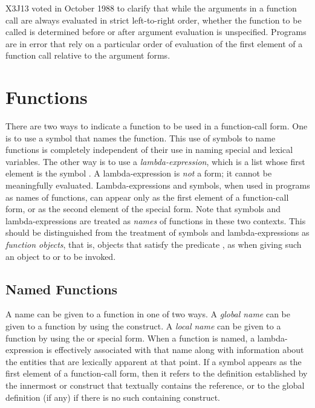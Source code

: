 \begin{newer}
X3J13 voted in October 1988 
to clarify that while the arguments in a function call are always
evaluated in strict left-to-right order, whether the function to
be called is determined before or after argument evaluation
is unspecified.  Programs are in error
that rely on a particular order of evaluation
of the first element of a function call relative to the
argument forms.
\end{newer}

\section{Functions}

There are two ways to indicate a function to be used in a function-call
form.  One is to use a symbol that names the function.  This use of
symbols to name functions is completely independent of their use in
naming special and lexical variables.  The other way is to use a
\emph{lambda-expression}, which is a list whose first element is the symbol
.  A lambda-expression is \emph{not} a form; it cannot be
meaningfully evaluated.  Lambda-expressions and symbols, when used in
programs as names of functions, can appear only as the first element of a
function-call form, or as the second element of the 
special form.  Note that symbols and lambda-expressions are treated as
\emph{names} of functions in these two contexts.  This should be
distinguished from the treatment of symbols and lambda-expressions as
\emph{function objects}, that is,
objects that satisfy the predicate ,
as when giving such an object to  or  to be
invoked.

\subsection{Named Functions}

A name can be given to a function in one of two ways.
A \emph{global name} can be given to a function by using the
 construct.
A \emph{local name} can be given to a function by using the
 or
 special form.
When a function is named, a lambda-expression is effectively
associated with that name
along with information about the entities that are lexically apparent
at that point.
If a symbol appears as the first element of a function-call form, then it
refers to the definition established by the innermost  or 
construct that textually contains the reference, or to the global
definition (if any) if there is no such containing construct.

